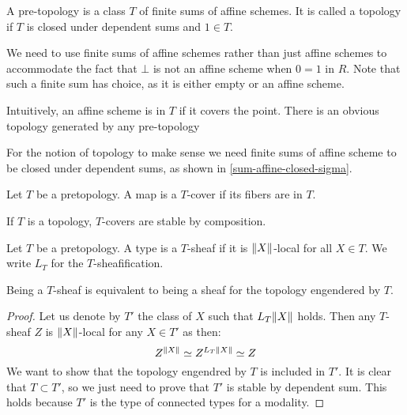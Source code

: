\begin{definition}
A pre-topology is a class $T$ of finite sums of affine schemes. It is called a topology if $T$ is closed under dependent sums and $1\in T$.
\end{definition}

\begin{remark}
We need to use finite sums of affine schemes rather than just affine schemes to accommodate the fact that $\bot$ is not an affine scheme when $0=1$ in $R$. Note that such a finite sum has choice, as it is either empty or an affine scheme.
\end{remark}

Intuitively, an affine scheme is in $T$ if it covers the point. There is an obvious topology generated by any pre-topology

\begin{remark}
For the notion of topology to make sense we need finite sums of affine scheme to be closed under dependent sums, as shown in \cref{sum-affine-closed-sigma}.
\end{remark}

\begin{definition}
Let $T$ be a pretopology. A map is a $T$-cover if its fibers are in $T$.
\end{definition} 

If $T$ is a topology, $T$-covers are stable by composition.

\begin{definition}
Let $T$ be a pretopology. A type is a $T$-sheaf if it is $\lVert X \rVert$-local for all $X\in T$. We write $L_T$ for the $T$-sheafification.
\end{definition}

\begin{lemma}\label{topology-pretopology-same-sheaves}
Being a $T$-sheaf is equivalent to being a sheaf for the topology engendered by $T$.
\end{lemma}

\begin{proof}
Let us denote by $T'$ the class of $X$ such that $L_T\lVert X \rVert$ holds. Then any $T$-sheaf $Z$ is $\lVert X \rVert$-local for any $X\in T'$ as then: 
\[Z^{\lVert X \rVert}\simeq Z^{L_T\lVert X \rVert} \simeq Z\]
We want to show that the topology engendred by $T$ is included in $T'$. It is clear that $T\subset T'$, so we just need to prove that $T'$ is stable by dependent sum. This holds because $T'$ is the type of connected types for a modality.
\end{proof}


